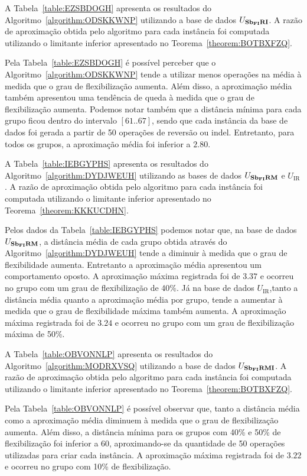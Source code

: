 A Tabela~\ref{table:EZSBDOGH} apresenta os resultados do Algoritmo~\ref{algorithm:ODSKKWNP} utilizando a base de dados $U_{\textbf{Sb\textsubscript{FI}RI}}{}$. A razão de aproximação obtida pelo algoritmo para cada instância foi computada utilizando o limitante inferior apresentado no Teorema~\ref{theorem:BOTBXFZQ}.



Pela Tabela~\ref{table:EZSBDOGH} é possível perceber que o Algoritmo~\ref{algorithm:ODSKKWNP} tende a utilizar menos operações na média à medida que o grau de flexibilização aumenta. Além disso, a aproximação média também apresentou uma tendência de queda à medida que o grau de flexibilização aumenta. Podemos notar também que a distância mínima para cada grupo ficou dentro do intervalo $[61..67]$, sendo que cada instância da base de dados foi gerada a partir de 50 operações de reversão ou indel. Entretanto, para todos os grupos, a aproximação média foi inferior a $2.80$.

A Tabela~\ref{table:IEBGYPHS} apresenta os resultados do Algoritmo~\ref{algorithm:DYDJWEUH} utilizando as bases de dados $U_{\textbf{Sb\textsubscript{FI}RM}}{}$ e $U_{\text{IR}}$. A razão de aproximação obtida pelo algoritmo para cada instância foi computada utilizando o limitante inferior apresentado no Teorema~\ref{theorem:KKKUCDHN}.



Pelos dados da Tabela~\ref{table:IEBGYPHS} podemos notar que, na base de dados $U_{\textbf{Sb\textsubscript{FI}RM}}{}$, a distância média de cada grupo obtida através do Algoritmo~\ref{algorithm:DYDJWEUH} tende a diminuir à medida que o grau de flexibilidade aumenta. Entretanto a aproximação média apresentou um comportamento oposto. A aproximação máxima registrada foi de $3.37$ e ocorreu no grupo com um grau de flexibilização de 40\%. Já na base de dados $U_{\text{IR}}$,tanto a distância média quanto a aproximação média por grupo, tende a aumentar à medida que o grau de flexibilidade máxima também aumenta. A aproximação máxima registrada foi de $3.24$ e ocorreu no grupo com um grau de flexibilização máxima de 50\%.

A Tabela~\ref{table:OBVONNLP} apresenta os resultados do Algoritmo~\ref{algorithm:MODRXVSQ} utilizando a base de dados $U_{\textbf{Sb\textsubscript{FI}RMI}}{}$. A razão de aproximação obtida pelo algoritmo para cada instância foi computada utilizando o limitante inferior apresentado no Teorema~\ref{theorem:BOTBXFZQ}.



Pela Tabela~\ref{table:OBVONNLP} é possível observar que, tanto a distância média como a aproximação média diminuem à medida que o grau de flexibilização aumenta. Além disso, a distância mínima para os grupos com 40\% e 50\% de flexibilização foi inferior a 60, aproximando-se da quantidade de 50 operações utilizadas para criar cada instância. A aproximação máxima registrada foi de $3.22$ e ocorreu no grupo com 10\% de flexibilização.

